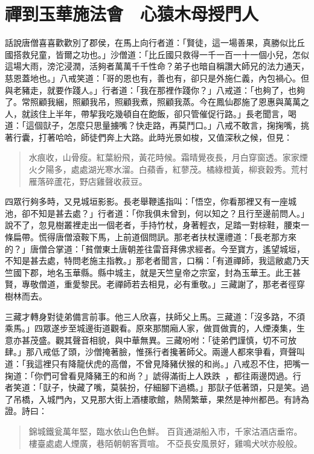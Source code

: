 
\chapter{禪到玉華施法會　心猿木母授門人}

話說唐僧喜喜歡歡別了郡侯，在馬上向行者道：「賢徒，這一場善果，真勝似比丘國搭救兒童，皆爾之功也。」沙僧道：「比丘國只救得一千一百一十一個小兒，怎似這場大雨，滂沱浸潤，活夠者萬萬千千性命？弟子也暗自稱讚大師兄的法力通天，慈恩蓋地也。」八戒笑道：「哥的恩也有，善也有，卻只是外施仁義，內包禍心。但與老豬走，就要作踐人。」行者道：「我在那裡作踐你？」八戒道：「也夠了，也夠了。常照顧我綑，照顧我吊，照顧我煮，照顧我蒸。今在鳳仙郡施了恩惠與萬萬之人，就該住上半年，帶挈我吃幾頓自在飽飯，卻只管催促行路。」長老聞言，喝道：「這個獃子，怎麼只思量擄嘴？快走路，再莫鬥口。」八戒不敢言，掬掬嘴，挑著行囊，打著哈哈，師徒們奔上大路。此時光景如梭，又值深秋之候，但見：
\begin{quote}
水痕收，山骨瘦。紅葉紛飛，黃花時候。霜晴覺夜長，月白穿窗透。家家煙火夕陽多，處處湖光寒水溜。白蘋香，紅蓼茂。橘綠橙黃，柳衰穀秀。荒村雁落碎蘆花，野店雞聲收菽豆。
\end{quote}

四眾行夠多時，又見城垣影影。長老舉鞭遙指叫：「悟空，你看那裡又有一座城池，卻不知是甚去處？」行者道：「你我俱未曾到，何以知之？且行至邊前問人。」說不了，忽見樹叢裡走出一個老者，手持竹杖，身著輕衣，足踏一對棕鞋，腰束一條扁帶。慌得唐僧滾鞍下馬，上前道個問訊。那老者扶杖還禮道：「長老那方來的？」唐僧合掌道：「貧僧東土唐朝差往雷音拜佛求經者。今至寶方，遙望城垣，不知是甚去處，特問老施主指教。」那老者聞言，口稱：「有道禪師，我這敝處乃天竺國下郡，地名玉華縣。縣中城主，就是天竺皇帝之宗室，封為玉華王。此王甚賢，專敬僧道，重愛黎民。老禪師若去相見，必有重敬。」三藏謝了，那老者徑穿樹林而去。

三藏才轉身對徒弟備言前事。他三人欣喜，扶師父上馬。三藏道：「沒多路，不須乘馬。」四眾遂步至城邊街道觀看。原來那關廂人家，做買做賣的，人煙湊集，生意亦甚茂盛。觀其聲音相貌，與中華無異。三藏吩咐：「徒弟們謹慎，切不可放肆。」那八戒低了頭，沙僧掩著臉，惟孫行者攙著師父。兩邊人都來爭看，齊聲叫道：「我這裡只有降龍伏虎的高僧，不曾見降豬伏猴的和尚。」八戒忍不住，把嘴一掬道：「你們可曾看見降豬王的和尚？」諕得滿街上人跌跌𧿼𧿼，都往兩邊閃過。行者笑道：「獃子，快藏了嘴，莫裝扮，仔細腳下過橋。」那獃子低著頭，只是笑。過了吊橋，入城門內，又見那大街上酒樓歌館，熱鬧繁華，果然是神州都邑。有詩為證。詩曰：
\begin{quote}
錦城鐵瓮萬年堅，臨水依山色色鮮。
百貨通湖船入市，千家沽酒店垂帘。
樓臺處處人煙廣，巷陌朝朝客賈喧。
不亞長安風景好，雞鳴犬吠亦般般。
\end{quote}

